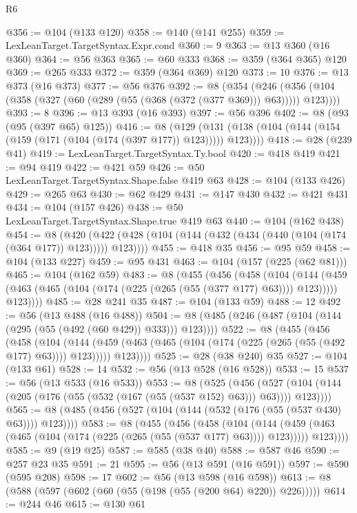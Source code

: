 \begin{lexlean}{R6}
\begin{coremodule}
{{{{{{{{{{{{{{{{{{{{@356 := @104 (@133 @120)
@358 := @140 (@141 @255)
@359 := LexLeanTarget.TargetSyntax.Expr.cond
@360 := 9
@363 := @13 @360 (@16 @360)
@364 := @56 @363
@365 := @60 @333
@368 := @359 (@364 @365) @120
@369 := @265 @333
@372 := @359 (@364 @369) @120
@373 := 10
@376 := @13 @373 (@16 @373)
@377 := @56 @376
@392 := @8
    (@354 (@246 (@356 (@104 (@358 (@327 (@60 (@289 (@55 (@368 (@372 (@377 @369))) @63))))) @123))))
@393 := 8
@396 := @13 @393 (@16 @393)
@397 := @56 @396
@402 := @8 (@93 (@95 (@397 @65) @125))
@416 := @8
    (@129 (@131 (@138 (@104 (@144 (@154 (@159 (@171 (@104 (@174 (@397 @177)) @123))))) @123))))
@418 := @28 (@239 @41)
@419 := LexLeanTarget.TargetSyntax.Ty.bool
@420 := @418 @419
@421 := @94 @419
@422 := @421 @59
@426 := @50 LexLeanTarget.TargetSyntax.Shape.false @419 @63
@428 := @104 (@133 @426)
@429 := @265 @63
@430 := @62 @429
@431 := @147 @430
@432 := @421 @431
@434 := @104 (@157 @426)
@438 := @50 LexLeanTarget.TargetSyntax.Shape.true @419 @63
@440 := @104 (@162 @438)
@454 := @8
    (@420 (@422 (@428 (@104 (@144 (@432 (@434 (@440 (@104 (@174 (@364 @177)) @123))))) @123))))
@455 := @418 @35
@456 := @95 @59
@458 := @104 (@133 @227)
@459 := @95 @431
@463 := @104 (@157 (@225 (@62 @81)))
@465 := @104 (@162 @59)
@483 := @8
    (@455
      (@456
        (@458
          (@104
            (@144 (@459 (@463 (@465 (@104 (@174 (@225 (@265 (@55 (@377 @177) @63)))) @123)))))
            @123))))
@485 := @28 @241 @35
@487 := @104 (@133 @59)
@488 := 12
@492 := @56 (@13 @488 (@16 @488))
@504 := @8 (@485 (@246 (@487 (@104 (@144 (@295 (@55 (@492 (@60 @429)) @333))) @123))))
@522 := @8
    (@455
      (@456
        (@458
          (@104
            (@144 (@459 (@463 (@465 (@104 (@174 (@225 (@265 (@55 (@492 @177) @63)))) @123)))))
            @123))))
@525 := @28 (@38 @240) @35
@527 := @104 (@133 @61)
@528 := 14
@532 := @56 (@13 @528 (@16 @528))
@533 := 15
@537 := @56 (@13 @533 (@16 @533))
@553 := @8
    (@525
      (@456 (@527 (@104 (@144 (@205 (@176 (@55 (@532 (@167 (@55 (@537 @152) @63))) @63)))) @123))))
@565 := @8 (@485 (@456 (@527 (@104 (@144 (@532 (@176 (@55 (@537 @430) @63)))) @123))))
@583 := @8
    (@455
      (@456
        (@458
          (@104
            (@144 (@459 (@463 (@465 (@104 (@174 (@225 (@265 (@55 (@537 @177) @63)))) @123)))))
            @123))))
@585 := @9 (@19 @25)
@587 := @585 (@38 @40)
@588 := @587 @46
@590 := @257 @23 @35
@591 := 21
@595 := @56 (@13 @591 (@16 @591))
@597 := @590 (@595 @208)
@598 := 17
@602 := @56 (@13 @598 (@16 @598))
@613 := @8 (@588 (@597 (@602 (@60 (@55 (@198 (@55 (@200 @64) @220)) @226)))))
@614 := @244 @46
@615 := @130 @61
}}}}}}}}}}}}}}}}}}}}
\end{coremodule}
\end{lexlean}
